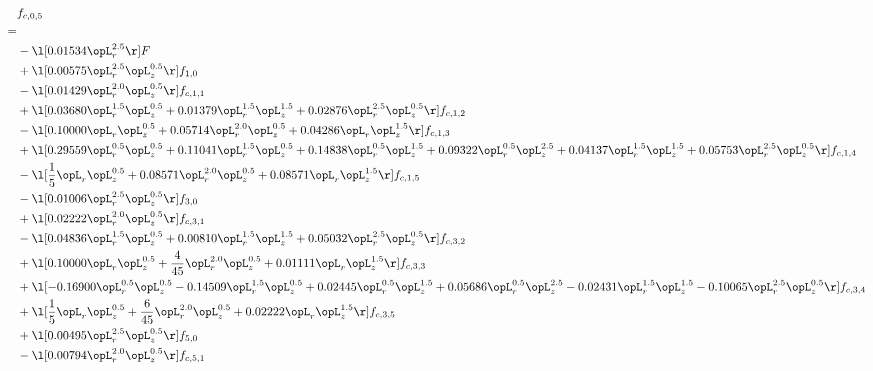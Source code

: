 \begin{alignat}{2} 
\label{eq:f_05_1} 
& f_{c,0,5} \nonumber \\ 
 = \\ 
& - \l[  0.01534 \opL_r^{2.5}  \r] F \nonumber \\ 
& + \l[  0.00575 \opL_r^{2.5} \opL_z^{0.5}  \r] f_{1,0} \nonumber \\ 
& - \l[  0.01429 \opL_r^{2.0} \opL_z^{0.5}  \r] f_{c,1,1} \nonumber \\ 
& + \l[  0.03680 \opL_r^{1.5} \opL_z^{0.5} +  0.01379 \opL_r^{1.5} \opL_z^{1.5} +  0.02876 \opL_r^{2.5} \opL_z^{0.5}  \r] f_{c,1,2} \nonumber \\ 
& - \l[  0.10000 \opL_r \opL_z^{0.5} +  0.05714 \opL_r^{2.0} \opL_z^{0.5} +  0.04286 \opL_r \opL_z^{1.5}  \r] f_{c,1,3} \nonumber \\ 
& + \l[  0.29559 \opL_r^{0.5} \opL_z^{0.5} +  0.11041 \opL_r^{1.5} \opL_z^{0.5} +  0.14838 \opL_r^{0.5} \opL_z^{1.5} +  0.09322 \opL_r^{0.5} \opL_z^{2.5} +  0.04137 \opL_r^{1.5} \opL_z^{1.5} +  0.05753 \opL_r^{2.5} \opL_z^{0.5}  \r] f_{c,1,4} \nonumber \\ 
& - \l[ \frac{1}{5} \opL_r \opL_z^{0.5} +  0.08571 \opL_r^{2.0} \opL_z^{0.5} +  0.08571 \opL_r \opL_z^{1.5}  \r] f_{c,1,5} \nonumber \\ 
& - \l[  0.01006 \opL_r^{2.5} \opL_z^{0.5}  \r] f_{3,0} \nonumber \\ 
& + \l[  0.02222 \opL_r^{2.0} \opL_z^{0.5}  \r] f_{c,3,1} \nonumber \\ 
& - \l[  0.04836 \opL_r^{1.5} \opL_z^{0.5} +  0.00810 \opL_r^{1.5} \opL_z^{1.5} +  0.05032 \opL_r^{2.5} \opL_z^{0.5}  \r] f_{c,3,2} \nonumber \\ 
& + \l[  0.10000 \opL_r \opL_z^{0.5} + \frac{4}{45} \opL_r^{2.0} \opL_z^{0.5} +  0.01111 \opL_r \opL_z^{1.5}  \r] f_{c,3,3} \nonumber \\ 
& + \l[  -0.16900 \opL_r^{0.5} \opL_z^{0.5}   -0.14509 \opL_r^{1.5} \opL_z^{0.5} +  0.02445 \opL_r^{0.5} \opL_z^{1.5} +  0.05686 \opL_r^{0.5} \opL_z^{2.5}   -0.02431 \opL_r^{1.5} \opL_z^{1.5}   -0.10065 \opL_r^{2.5} \opL_z^{0.5}  \r] f_{c,3,4} \nonumber \\ 
& + \l[ \frac{1}{5} \opL_r \opL_z^{0.5} + \frac{6}{45} \opL_r^{2.0} \opL_z^{0.5} +  0.02222 \opL_r \opL_z^{1.5}  \r] f_{c,3,5} \nonumber \\ 
& + \l[  0.00495 \opL_r^{2.5} \opL_z^{0.5}  \r] f_{5,0} \nonumber \\ 
& - \l[  0.00794 \opL_r^{2.0} \opL_z^{0.5}  \r] f_{c,5,1} \nonumber \\ 

\end{alignat}
